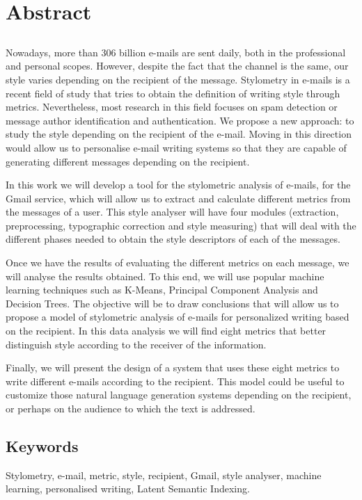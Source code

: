 \chapter*{Abstract}

\section*{\tituloPortadaEngVal}

Nowadays, more than 306 billion e-mails are sent daily, both in the professional and personal scopes. However, despite the fact that the channel is the same, our style varies depending on the recipient of the message. Stylometry in e-mails is a recent field of study that tries to obtain the definition of writing style through metrics. Nevertheless, most research in this field focuses on spam detection or message author identification and authentication. We propose a new approach: to study the style depending on the recipient of the e-mail. Moving in this direction would allow us to personalise e-mail writing systems so that they are capable of generating different messages depending on the recipient.

In this work we will develop a tool for the stylometric analysis of e-mails, for the Gmail service, which will allow us to extract and calculate different metrics from the messages of a user. This style analyser will have four modules (extraction, preprocessing, typographic correction and style measuring) that will deal with the different phases needed to obtain the style descriptors of each of the messages.

Once we have the results of evaluating the different metrics on each message, we will analyse the results obtained. To this end, we will use popular machine learning techniques such as K-Means, Principal Component Analysis and Decision Trees. The objective will be to draw conclusions that will allow us to propose a model of stylometric analysis of e-mails for personalized writing based on the recipient. In this data analysis we will find eight metrics that better distinguish style according to the receiver of the information.

Finally, we will present the design of a system that uses these eight metrics to write different e-mails according to the recipient. This model could be useful to customize those natural language generation systems depending on the recipient, or perhaps on the audience to which the text is addressed.

\section*{Keywords}

\noindent Stylometry, e-mail, metric, style, recipient, Gmail, style analyser, machine learning, personalised writing, Latent Semantic Indexing.



